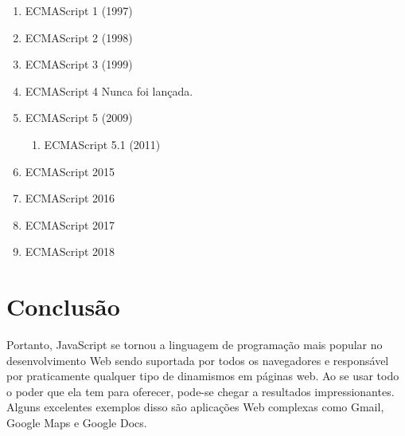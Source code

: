 \begin{enumerate}
  \item ECMAScript 1 (1997)	
  \item ECMAScript 2 (1998)	
  \item ECMAScript 3 (1999)	
  \item ECMAScript 4	Nunca foi lançada.
  \item ECMAScript 5 (2009)
    \begin{enumerate}[label*=\arabic*.]
    \item ECMAScript 5.1 (2011)
    \end{enumerate}
  \item ECMAScript 2015
  \item ECMAScript 2016
  \item ECMAScript 2017
  \item ECMAScript 2018
\end{enumerate}

\section{Conclusão}
Portanto, JavaScript se tornou a linguagem de programação mais popular no desenvolvimento Web sendo suportada por todos os navegadores e responsável por praticamente qualquer tipo de dinamismos em páginas web. Ao se usar todo o poder que ela tem para oferecer, pode-se chegar a resultados impressionantes. Alguns excelentes exemplos disso são aplicações Web complexas como Gmail, Google Maps e Google Docs. 
